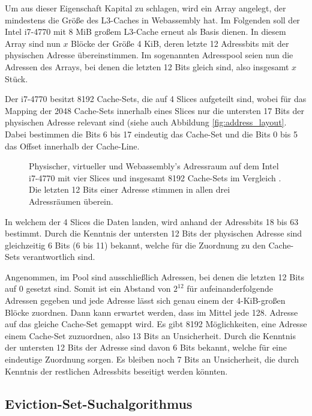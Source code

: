 Um aus dieser Eigenschaft Kapital zu schlagen, wird ein Array angelegt, der mindestens die Größe des L3-Caches in Webassembly hat. Im Folgenden soll der Intel i7-4770 mit 8 MiB großem L3-Cache erneut als Basis dienen. In diesem Array sind nun $x$ Blöcke der Größe 4 KiB, deren letzte 12 Adressbits mit der physischen Adresse übereinstimmen. Im sogenannten Adresspool seien nun die Adressen des Arrays, bei denen die letzten 12 Bits gleich sind, also insgesamt $x$ Stück.

Der i7-4770 besitzt 8192 Cache-Sets, die auf 4 Slices aufgeteilt sind, wobei für das Mapping der 2048 Cache-Sets innerhalb eines Slices nur die untersten 17 Bits der physischen Adresse relevant sind (siehe auch Abbildung \ref{fig:address_layout}. Dabei bestimmen die Bits 6 bis 17 eindeutig das Cache-Set und die Bits 0 bis 5 das Offset innerhalb der Cache-Line.

\label{fig:address_layout}
\begin{figure}[h]
\centering
\begin{scaletikzpicturetowidth}{\textwidth}

\end{scaletikzpicturetowidth}
\caption{Physischer, virtueller und Webassembly's Adressraum auf dem Intel i7-4770 mit vier Slices und insgesamt 8192 Cache-Sets im Vergleich \cite{DriveByPaper}. Die letzten 12 Bits einer Adresse stimmen in allen drei Adressräumen überein.}
\end{figure}

In welchem der 4 Slices die Daten landen, wird anhand der Adressbits 18 bis 63 bestimmt.
Durch die Kenntnis der untersten 12 Bits der physischen Adresse sind gleichzeitig 6 Bits (6 bis 11) bekannt, welche für die Zuordnung zu den Cache-Sets verantwortlich sind.

Angenommen, im Pool sind ausschließlich Adressen, bei denen die letzten 12 Bits auf 0 gesetzt sind. 
Somit ist ein Abstand von $2^{12}$ für aufeinanderfolgende Adressen gegeben und jede Adresse lässt sich genau einem der 4-KiB-großen Blöcke zuordnen.
Dann kann erwartet werden, dass im Mittel jede 128. 
Adresse auf das gleiche Cache-Set gemappt wird. Es gibt 8192 Möglichkeiten, eine Adresse einem Cache-Set zuzuordnen, also 13 Bits an Unsicherheit.
Durch die Kenntnis der untersten 12 Bits der Adresse sind davon 6 Bits bekannt, welche für eine eindeutige Zuordnung sorgen. 
Es bleiben noch 7 Bits an Unsicherheit, die durch Kenntnis der restlichen Adressbits beseitigt werden könnten.

\subsection{Eviction-Set-Suchalgorithmus}
\label{evictionSetSearchAlgo}

